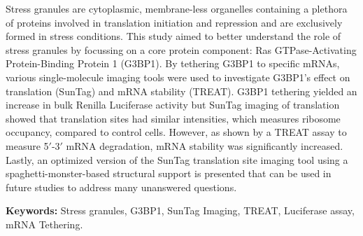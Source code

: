 Stress granules are cytoplasmic, membrane-less organelles containing a plethora of proteins involved in translation initiation and repression and are exclusively formed in stress conditions.
This study aimed to better understand the role of stress granules by focussing on a core protein component: Ras GTPase-Activating Protein-Binding Protein 1 (G3BP1).
By tethering G3BP1 to specific mRNAs, various single-molecule imaging tools were used to investigate G3BP1's effect on translation (SunTag) and mRNA stability (TREAT).
G3BP1 tethering yielded an increase in bulk Renilla Luciferase activity but SunTag imaging of translation showed that translation sites had similar intensities, which measures ribosome occupancy, compared to control cells.
However, as shown by a TREAT assay to measure 5$'$-3$'$ mRNA degradation, mRNA stability was significantly increased.
Lastly, an optimized version of the SunTag translation site imaging tool using a spaghetti-monster-based structural support is presented that can be used in future studies to address many unanswered questions.

\noindent
\textbf{Keywords:}
Stress granules, G3BP1, SunTag Imaging, TREAT, Luciferase assay, mRNA Tethering.

